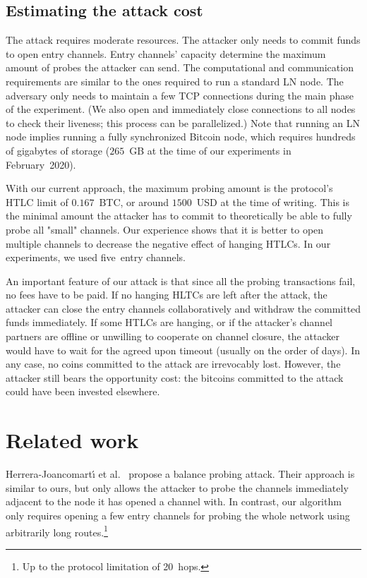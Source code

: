 \subsection{Estimating the attack cost}

The attack requires moderate resources.
The attacker only needs to commit funds to open entry channels.
Entry channels' capacity determine the maximum amount of probes the attacker can send.
The computational and communication requirements are similar to the ones required to run a standard LN node.
The adversary only needs to maintain a few TCP connections during the main phase of the experiment.
(We also open and immediately close connections to all nodes to check their liveness; this process can be parallelized.)
Note that running an LN node implies running a fully synchronized Bitcoin node, which requires hundreds of gigabytes of storage ($265$~GB at the time of our experiments in February~2020).

With our current approach, the maximum probing amount is the protocol's HTLC limit of $0.167$~BTC, or around $1500$~USD at the time of writing.
This is the minimal amount the attacker has to commit to theoretically be able to fully probe all "small" channels.
Our experience shows that it is better to open multiple channels to decrease the negative effect of hanging HTLCs.
In our experiments, we used five~entry channels.

An important feature of our attack is that since all the probing transactions fail, no fees have to be paid.
If no hanging HLTCs are left after the attack, the attacker can close the entry channels collaboratively and withdraw the committed funds immediately.
If some HTLCs are hanging, or if the attacker's channel partners are offline or unwilling to cooperate on channel closure, the attacker would have to wait for the agreed upon timeout (usually on the order of days).
In any case, no coins committed to the attack are irrevocably lost.
However, the attacker still bears the opportunity cost: the bitcoins committed to the attack could have been invested elsewhere.


\section{Related work} \label{sec:related-work}
Herrera{-}Joancomart{\'{\i}} et al.~\cite{HerreraJoancomarti2019} propose a balance probing attack.
Their approach is similar to ours, but only allows the attacker to probe the channels immediately adjacent to the node it has opened a channel with.
In contrast, our algorithm only requires opening a few entry channels for probing the whole network using arbitrarily long routes.\footnote{Up to the protocol limitation of 20~hops.}

